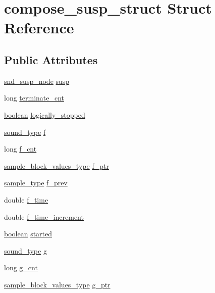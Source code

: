 \hypertarget{structcompose__susp__struct}{}\section{compose\+\_\+susp\+\_\+struct Struct Reference}
\label{structcompose__susp__struct}
\subsection*{Public Attributes}
\begin{DoxyCompactItemize}
\item 
\hyperlink{sound_8h_a6b268203688a934bd798ceb55f85d4c0}{snd\+\_\+susp\+\_\+node} \hyperlink{structcompose__susp__struct_acd80b164892451dfe664760467629910}{susp}
\item 
long \hyperlink{structcompose__susp__struct_adde8df62bcfa3ef4f54e09e0dd72a323}{terminate\+\_\+cnt}
\item 
\hyperlink{cext_8h_a7670a4e8a07d9ebb00411948b0bbf86d}{boolean} \hyperlink{structcompose__susp__struct_a5440fefae91c4b0a395e9c7203b5bbfa}{logically\+\_\+stopped}
\item 
\hyperlink{sound_8h_a792cec4ed9d6d636d342d9365ba265ea}{sound\+\_\+type} \hyperlink{structcompose__susp__struct_ad5eff317454998fc1f0fc67b85b511c3}{f}
\item 
long \hyperlink{structcompose__susp__struct_a876b3e54d43c6842d371c68f733e3031}{f\+\_\+cnt}
\item 
\hyperlink{sound_8h_a83d17f7b465d1591f27cd28fc5eb8a03}{sample\+\_\+block\+\_\+values\+\_\+type} \hyperlink{structcompose__susp__struct_a57d3f35fec97705986d1da6b88003bea}{f\+\_\+ptr}
\item 
\hyperlink{sound_8h_a3a9d1d4a1c153390d2401a6e9f71b32c}{sample\+\_\+type} \hyperlink{structcompose__susp__struct_ac9bf98ace86771f0f568405b8bd30d13}{f\+\_\+prev}
\item 
double \hyperlink{structcompose__susp__struct_a985ec562e0a1a49278607bd0af96343a}{f\+\_\+time}
\item 
double \hyperlink{structcompose__susp__struct_a927d8e9cad44c0b07965ea81ef93f374}{f\+\_\+time\+\_\+increment}
\item 
\hyperlink{cext_8h_a7670a4e8a07d9ebb00411948b0bbf86d}{boolean} \hyperlink{structcompose__susp__struct_adaeb2fca5a7b2c757364d9ded00af62f}{started}
\item 
\hyperlink{sound_8h_a792cec4ed9d6d636d342d9365ba265ea}{sound\+\_\+type} \hyperlink{structcompose__susp__struct_a2ec68b798c6128b551a843b2186a69d5}{g}
\item 
long \hyperlink{structcompose__susp__struct_a09c4ba1cc1c8f9edbb70de6d32448f30}{g\+\_\+cnt}
\item 
\hyperlink{sound_8h_a83d17f7b465d1591f27cd28fc5eb8a03}{sample\+\_\+block\+\_\+values\+\_\+type} \hyperlink{structcompose__susp__struct_a2350356afc0eb2dfce02be8b93d672e1}{g\+\_\+ptr}
\end{DoxyCompactItemize}


